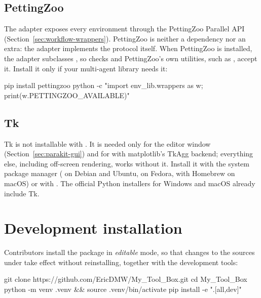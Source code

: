 \subsection{PettingZoo}\label{sec:install-pettingzoo}

The adapter  exposes every environment
through the PettingZoo Parallel API (Section~\ref{sec:workflow-wrappers}).
PettingZoo is neither a dependency nor an extra: the adapter implements the
protocol itself. When PettingZoo is installed, the adapter subclasses
, so  checks and
PettingZoo's own utilities, such as , accept it.
Install it only if your multi-agent library needs it:

\begin{shellcode}
pip install pettingzoo
python -c "import env_lib.wrappers as w; print(w.PETTINGZOO_AVAILABLE)"
\end{shellcode}

\subsection{Tk}\label{sec:install-tk}

Tk is not installable with . It is needed only for the
 editor window (Section~\ref{sec:parakit-gui}) and for
 with matplotlib's TkAgg backend; everything else,
including off-screen rendering, works without it. Install it with the system
package manager ( on Debian and Ubuntu,
 on Fedora,  with Homebrew on macOS) or with . The
official Python installers for Windows and macOS already include Tk.

\section{Development installation}\label{sec:install-dev}

Contributors install the package in \emph{editable} mode, so that changes to
the sources under  take effect without reinstalling, together with
the development tools:

\begin{shellcode}
git clone https://github.com/EricDMW/My_Tool_Box.git
cd My_Tool_Box
python -m venv .venv && source .venv/bin/activate
pip install -e ".[all,dev]"
\end{shellcode}

